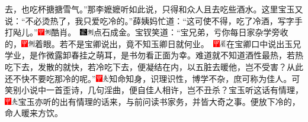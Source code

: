 去，也吃杯搪搪雪气。''那李嬷嬷听如此说，只得和众人且去吃些酒水。这里宝玉又说：``不必烫热了，我只爱吃冷的。''薛姨妈忙道：``这可使不得，吃了冷酒，写字手打飐儿。''{{\includegraphics[width=3mm]{../Images/00002}\includegraphics[width=3mm]{../Images/00011}\footnotesize \kaishu 酷肖。　}\includegraphics[width=3mm]{../Images/00006}\includegraphics[width=3mm]{../Images/00011}\footnotesize \kaishu 点石成金。}宝钗笑道：``宝兄弟，亏你每日家杂学旁收的，{\includegraphics[width=3mm]{../Images/00002}\includegraphics[width=3mm]{../Images/00011}\footnotesize \kaishu 着眼。若不是宝卿说出，竟不知玉卿日就何业。　\includegraphics[width=3mm]{../Images/00002}\includegraphics[width=3mm]{../Images/00010}\footnotesize \kaishu 在宝卿口中说出玉兄学业，是作微露卸春挂之萌耳，是书勿看正面为幸。}难道就不知道酒性最热，若热吃下去，发散的就快，若冷吃下去，便凝结在内，以五脏去暖他，岂不受害？从此还不快不要吃那冷的呢。''{\includegraphics[width=3mm]{../Images/00002}\includegraphics[width=3mm]{../Images/00012}\footnotesize \kaishu 知命知身，识理识性，博学不杂，庶可称为佳人。可笑别小说中一首歪诗，几句淫曲，便自佳人相许，岂不丑杀？}宝玉听这话有情理，{\includegraphics[width=3mm]{../Images/00002}\includegraphics[width=3mm]{../Images/00012}\footnotesize \kaishu 宝玉亦听的出有情理的话来，与前问读书家务，并皆大奇之事。}便放下冷的，命人暖来方饮。

